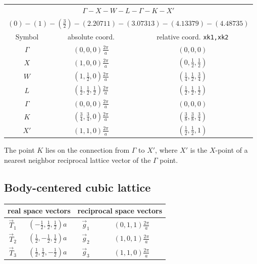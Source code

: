 \documentclass[final,12pt,makeidx,DIV=calc]{article}
\begin{document}
{{{{{{\begin{center}
\renewcommand\arraystretch{1.5}
\begin{tabular}{|c|c|c|}
\hline
\multicolumn{3}{|c|}{$\Gamma-X-W-L-\Gamma-K-X'$}\\
\multicolumn{3}{|c|}{$(0)-(1)-(\frac{3}{2})-(2.20711)-(3.07313)-(4.13379)-(4.48735)$}\\
\hline
Symbol & absolute coord. & relative coord. \texttt{xk1,xk2}\\
\hline
$\Gamma$   & $(0,0,0) \frac{2\pi}{a}$ & $(0,0,0)$ \\ 
$X$        & $(1,0,0) \frac{2\pi}{a}$ & $(0,\frac{1}{2},\frac{1}{2})$ \\ 
$W$        & $(1,\frac{1}{2},0) \frac{2\pi}{a}$ & $(\frac{1}{4},\frac{1}{2},\frac{3}{4})$ \\ 
$L$        & $(\frac{1}{2},\frac{1}{2},\frac{1}{2}) \frac{2\pi}{a}$ & $(\frac{1}{2},\frac{1}{2},\frac{1}{2})$ \\ 
$\Gamma$   & $(0,0,0) \frac{2\pi}{a}$ & $(0,0,0)$ \\ 
$K$        & $(\frac{3}{4},\frac{3}{4},0) \frac{2\pi}{a}$ & $(\frac{3}{8},\frac{3}{8},\frac{3}{4})$ \\ 
$X'$       & $(1,1,0) \frac{2\pi}{a}$ & $(\frac{1}{2},\frac{1}{2},1)$ \\ 
\hline
\end{tabular}
\renewcommand\arraystretch{1.}
\end{center}
The point $K$ lies on the connection from $\Gamma$ to $X'$, where $X'$
is the $X$-point of a nearest neighbor reciprocal lattice vector of the
$\Gamma$ point.

\subsection{Body-centered cubic lattice}
\begin{center}
\renewcommand\arraystretch{1.5}
\begin{tabular}{||c|c||c|c||}
\hline
\multicolumn{2}{|c|}{real space vectors} &
\multicolumn{2}{|c|}{reciprocal space vectors} \\
\hline
$\vec{T}_1$ & $(-\frac{1}{2},\frac{1}{2},\frac{1}{2}) a$ &
$\vec{g}_1$ & $(0,1,1)\frac{2\pi}{a}$ \\
$\vec{T}_2$ & $(\frac{1}{2},-\frac{1}{2},\frac{1}{2}) a$ &
$\vec{g}_2$ & $(1,0,1)\frac{2\pi}{a}$ \\
$\vec{T}_3$ & $(\frac{1}{2},\frac{1}{2},-\frac{1}{2}) a$ &
$\vec{g}_3$ & $(1,1,0)\frac{2\pi}{a}$ \\
\hline
\end{tabular}
\renewcommand\arraystretch{1.}
\end{center}

}}}}}}
\end{document}
